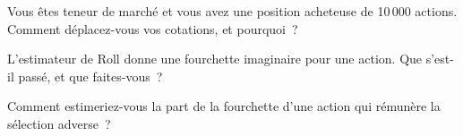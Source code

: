 \begin{interviewq}\label{iq:mx:why-there-is-a-spread:4}
Vous êtes teneur de marché et vous avez une position acheteuse de 10\,000 actions. Comment déplacez-vous vos cotations, et pourquoi~?
\end{interviewq}

\begin{interviewq}\label{iq:mx:why-there-is-a-spread:5}
L'estimateur de Roll donne une fourchette imaginaire pour une action. Que s'est-il passé, et que faites-vous~?
\end{interviewq}

\begin{interviewq}\label{iq:mx:why-there-is-a-spread:6}
Comment estimeriez-vous la part de la fourchette d'une action qui rémunère la sélection adverse~?
\end{interviewq}
